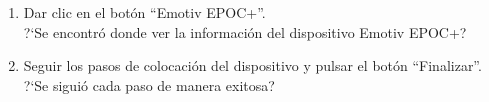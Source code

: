 \begin{enumerate}
	
	Nota: Finalizar el proceso de la terminal.
\item {Dar clic en el botón ``Emotiv EPOC+''.\\	
	?`Se encontró donde ver la información del dispositivo Emotiv EPOC+?
	}
	\item {Seguir los pasos de colocación del dispositivo y pulsar el botón ``Finalizar''.\\	
	?`Se siguió cada paso de manera exitosa?
	}
	

\end{enumerate}
